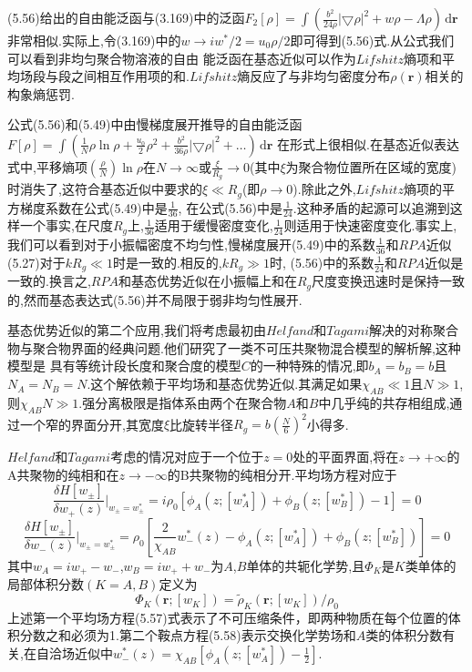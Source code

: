 (5.56)给出的自由能泛函与(3.169)中的泛函$F_2[\rho] = \int (\frac{b^2}{24\rho}|\bigtriangledown\rho |^2+w\rho-\Lambda\rho )\,\mathrm{d}\mathbf{r}$非常相似.实际上,令(3.169)中的$w\rightarrow iw^*/2 = u_0\rho/2$即可得到(5.56)式.从公式我们可以看到非均匀聚合物溶液的自由
能泛函在基态近似可以作为$Lifshitz$熵项和平均场段与段之间相互作用项的和.$Lifshitz$熵反应了与非均匀密度分布$\rho (\mathbf{r})$相关的构象熵惩罚.

公式(5.56)和(5.49)中由慢梯度展开推导的自由能泛函$F[\rho] = \int (\frac{1}{N}\rho\ln\rho+\frac{u_0}{2}\rho^2+\frac{b^2}{36\rho}|\bigtriangledown\rho|^2+\dots)\,\mathrm{d}\mathbf{r}$ 在形式上很相似.在基态近似表达式中,平移熵项$(\frac{\rho}{N})\ln \rho$在$N\rightarrow\infty$或$\frac{\xi}{R_g}\rightarrow0$(其中$\xi $为聚合物位置所在区域的宽度)时消失了,这符合基态近似中要求的$\xi \ll R_g$(即$\rho\rightarrow0$).除此之外,$Lifshitz$熵项的平方梯度系数在公式(5.49)中是$\frac{1}{36}$, 在公式(5.56)中是$\frac{1}{24}$.这种矛盾的起源可以追溯到这样一个事实,在尺度$R_g$上,$\frac{1}{36}$适用于缓慢密度变化,$\frac{1}{24}$则适用于快速密度变化.事实上,我们可以看到对于小振幅密度不均匀性,慢梯度展开(5.49)中的系数$\frac{1}{36}$和$RPA$近似(5.27)对于$kR_g\ll1$时是一致的.相反的,$kR_g \gg 1$时,
(5.56)中的系数$\frac{1}{24}$和$RPA$近似是一致的.换言之,$RPA$和基态优势近似在小振幅上和在$R_g$尺度变换迅速时是保持一致的,然而基态表达式(5.56)并不局限于弱非均匀性展开.

基态优势近似的第二个应用,我们将考虑最初由$Helfand$和$Tagami$解决的对称聚合物与聚合物界面的经典问题.他们研究了一类不可压共聚物混合模型的解析解,这种模型是 具有等统计段长度和聚合度的模型$C$的一种特殊的情况,即$b_A=b_B=b$且$N_A=N_B=N$.这个解依赖于平均场和基态优势近似.其满足如果$\chi_{AB}\ll1$且$N\gg1$,则$\chi_{AB}N\gg1$.强分离极限是指体系由两个在聚合物$A$和$B$中几乎纯的共存相组成,通过一个窄的界面分开,其宽度$\xi$比旋转半径$R_g=b(\frac{N}{6})^2$小得多.

$Helfand$和$Tagami$考虑的情况对应于一个位于$z=0$处的平面界面,将在$z\rightarrow +\infty$的A共聚物的纯相和在$z\rightarrow -\infty$的B共聚物的纯相分开.平均场方程对应于
\begin{equation}
{\frac{\delta H[w_\pm]}{\delta w_+(z)}}|_{w_\pm = w^*_\pm} = i\rho_0[\phi_A(z;[w^*_A])+\phi_B(z;[w^*_B])-1] = 0
\end{equation}
\begin{equation}
{\frac{\delta H[w_\pm]}{\delta w_-(z)}}|_{w_\pm = w^*_\pm} = \rho_0[\frac{2}{\chi_{AB}}w^*_-(z)-\phi_A(z;[w^*_A])+\phi_B(z;[w^*_B])]=0
\end{equation}
其中$w_A=iw_+ - w_-$,$w_B=iw_+ +w_-$为$A$,$B$单体的共轭化学势,且$\Phi_K$是$K$类单体的局部体积分数$(K=A,B)$定义为
\begin{equation}
\Phi_K(\mathbf{r};[w_K]) = \tilde{\rho}_K(\mathbf{r};[w_K])/\rho_0
\end{equation}
上述第一个平均场方程(5.57)式表示了不可压缩条件，即两种物质在每个位置的体积分数之和必须为1.第二个鞍点方程(5.58)表示交换化学势场和$A$类的体积分数有关,在自洽场近似中$w^*_-(z) = \chi_{AB}[\phi_A(z;[w^*_A])-\frac{1}{2}]$.

